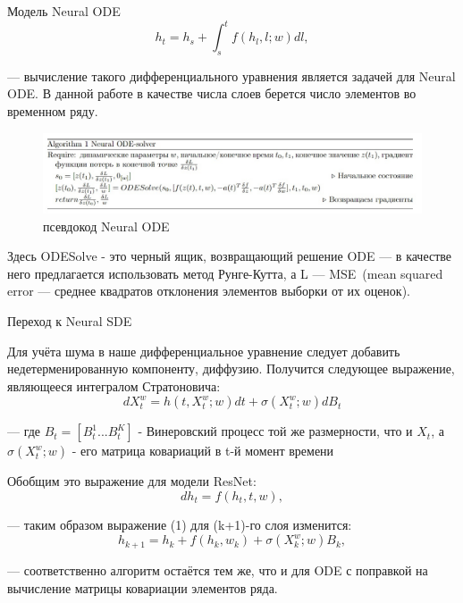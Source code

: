 \documentclass{beamer}
\begin{document}
\begin{frame}{Модель Neural ODE}
\begin{equation} h_{t} = h_s + \int_s^t f(h_l, l; w) dl,    \end{equation}
    \par --- вычисление такого дифференциального уравнения является задачей для Neural ODE. В данной работе в качестве числа слоев берется число элементов во временном ряду.
    \begin{figure}
\includegraphics[width=1.0\textwidth]{algo.jpg}
    \caption{псевдокод Neural ODE}
\end{figure}
   \par Здесь ODESolve - это черный ящик, возвращающий решение ODE --- в качестве него предлагается использовать метод Рунге-Кутта, а L --- MSE~(mean squared error --- среднее квадратов отклонения элементов выборки от их оценок).

\end{frame}

\begin{frame}{Переход к Neural SDE}

\par Для учёта шума в наше дифференциальное уравнение следует добавить недетерменированную компоненту, диффузию. Получится следующее выражение, являющееся интегралом Стратоновича:
      \begin{equation} dX_t^w = h(t, X_t^w; w) dt + \sigma(X_t^w;w) dB_t     \end{equation}
      \par --- где $B_t=[B_t^1...B_t^K]$ - Винеровский процесс той же размерности, что и $X_t$, а $\sigma(X_t^w;w)$ - его матрица ковариаций в t-й момент времени
      \par Обобщим это выражение для модели ResNet:
      \begin{equation}  dh_t = f(h_t, t, w),    \end{equation}
      \par --- таким образом выражение (1) для (k+1)-го слоя изменится:
      \begin{equation} h_{k+1} = h_k + f(h_k, w_k) +  \sigma(X_k^w;w) B_k,    \end{equation}
      \par --- соответственно алгоритм остаётся тем же, что и для ODE с поправкой на вычисление матрицы ковариации элементов ряда.

\end{frame}
\end{document}
